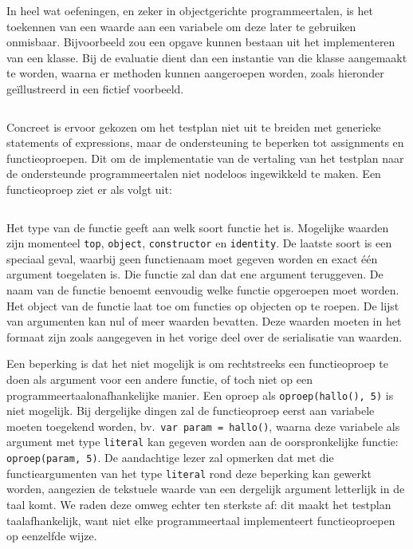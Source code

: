 In heel wat oefeningen, en zeker in objectgerichte programmeertalen, is het toekennen van een waarde aan een variabele om deze later te gebruiken onmisbaar.
Bijvoorbeeld zou een opgave kunnen bestaan uit het implementeren van een klasse.
Bij de evaluatie dient dan een instantie van die klasse aangemaakt te worden, waarna er methoden kunnen aangeroepen worden, zoals hieronder geïllustreerd in een fictief voorbeeld.

\inputminted{java}{code/assignment.jshell}

Concreet is ervoor gekozen om het testplan niet uit te breiden met generieke statements of expressions, maar de ondersteuning te beperken tot assignments en functieoproepen.
Dit om de implementatie van de vertaling van het testplan naar de ondersteunde programmeertalen niet nodeloos ingewikkeld te maken.
Een functieoproep ziet er als volgt uit:

\inputminted{json}{code/function.json}

Het type van de functie geeft aan welk soort functie het is.
Mogelijke waarden zijn momenteel \texttt{top}, \texttt{object}, \texttt{constructor} en \texttt{identity}.
De laatste soort is een speciaal geval, waarbij geen functienaam moet gegeven worden en exact één argument toegelaten is.
Die functie zal dan dat ene argument teruggeven.
De naam van de functie benoemt eenvoudig welke functie opgeroepen moet worden.
Het object van de functie laat toe om functies op objecten op te roepen.
De lijst van argumenten kan nul of meer waarden bevatten.
Deze waarden moeten in het formaat zijn zoals aangegeven in het vorige deel over de serialisatie van waarden.

Een beperking is dat het niet mogelijk is om rechtstreeks een functieoproep te doen als argument voor een andere functie,
of toch niet op een programmeertaalonafhankelijke manier.
Een oproep als \texttt{oproep(hallo(), 5)} is niet mogelijk.
Bij dergelijke dingen zal de functieoproep eerst aan variabele moeten toegekend worden, bv.\ \texttt{var param = hallo()}, waarna deze variabele als argument met type \texttt{literal} kan gegeven worden aan de oorspronkelijke functie: \texttt{oproep(param, 5)}.
De aandachtige lezer zal opmerken dat met die functieargumenten van het type \texttt{literal} rond deze beperking kan gewerkt worden, aangezien de tekstuele waarde van een dergelijk argument letterlijk in de taal komt.
We raden deze omweg echter ten sterkste af: dit maakt het testplan taalafhankelijk, want niet elke programmeertaal implementeert functieoproepen op eenzelfde wijze.

